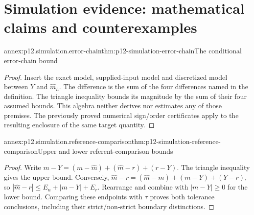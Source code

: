 \section{Simulation evidence: mathematical claims and counterexamples}
\label{sec:annex-p12-simulation-evidence}

\begin{annexitem}{annex:p12.simulation.error-chain}{thm:p12-simulation-error-chain}{The conditional error-chain bound}
\begin{proof}
Insert the exact model, supplied-input model and discretized model
between \(Y\) and \(\widehat m_h\). The difference is the sum of
the four differences named in the definition. The triangle inequality
bounds its magnitude by the sum of their four assumed bounds.
This algebra neither derives nor estimates any of those premises.
The previously proved numerical sign/order certificates apply to
the resulting enclosure of the same target quantity.
\end{proof}
\end{annexitem}

\begin{annexitem}{annex:p12.simulation.reference-comparison}{thm:p12-simulation-reference-comparison}{Upper and lower referent-comparison bounds}
\begin{proof}
Write
\(m-Y=(m-\widehat m)+(\widehat m-r)+(r-Y)\).
The triangle inequality gives the upper bound. Conversely,
\(\widehat m-r=(\widehat m-m)+(m-Y)+(Y-r)\), so
\(|\widehat m-r|\leq E_n+|m-Y|+E_r\).
Rearrange and combine with \(|m-Y|\geq0\) for the lower bound.
Comparing these endpoints with \(\tau\) proves both tolerance
conclusions, including their strict/non-strict boundary distinctions.
\end{proof}
\end{annexitem}

